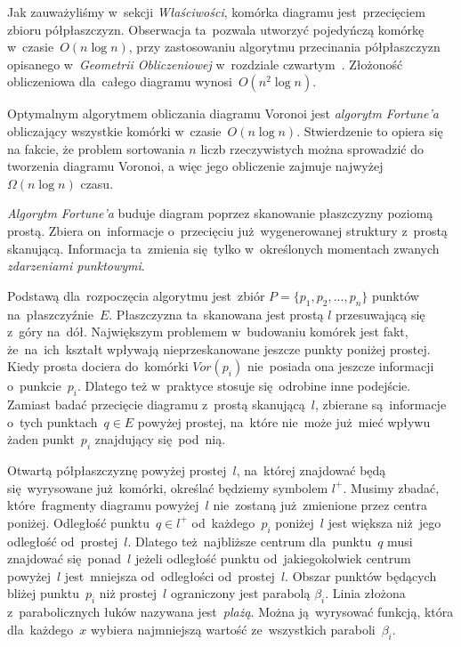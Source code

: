 \documentclass[skorowidz,autorrok,backref,xodstep,oswiadczenie]{wmimgr}
\begin{document}
Jak zauważyliśmy w~sekcji \emph{Właściwości}, komórka diagramu jest~przecięciem zbioru półpłaszczyzn. Obserwacja ta~pozwala utworzyć pojedyńczą komórkę w~czasie~$O(n \log{n})$, przy zastosowaniu algorytmu przecinania półpłaszczyzn opisanego w~\emph{Geometrii Obliczeniowej} w~rozdziale czwartym~\cite{geometria}. Złożoność obliczeniowa dla~całego diagramu wynosi~$O(n^2 \log{n})$.

Optymalnym algorytmem obliczania diagramu Voronoi jest \emph{algorytm Fortune'a} obliczający wszystkie komórki w~czasie~$O(n \log{n})$. Stwierdzenie to opiera się na fakcie, że problem sortowania $n$ liczb rzeczywistych można sprowadzić do tworzenia diagramu Voronoi, a więc jego obliczenie zajmuje najwyżej $\Omega(n \log{n})$ czasu.

\emph{Algorytm Fortune'a} buduje diagram poprzez skanowanie płaszczyzny poziomą prostą. Zbiera on~informacje o~przecięciu już~wygenerowanej struktury z~prostą skanującą. Informacja ta~zmienia się~tylko w~określonych momentach zwanych \emph{zdarzeniami punktowymi}.

Podstawą dla~rozpoczęcia algorytmu jest~zbiór $P = \{p_{1},p_{2},...,p_{n}\}$ punktów na~płaszczyźnie~$E$. Płaszczyzna ta~skanowana jest prostą $l$ przesuwającą się z~góry na~dół. Największym problemem w~budowaniu komórek jest fakt, że~na~ich~kształt wpływają nieprzeskanowane jeszcze punkty poniżej prostej. Kiedy prosta dociera do~komórki $Vor(p_{i})$ nie~posiada ona jeszcze informacji o~punkcie~$p_{i}$. Dlatego też w~praktyce stosuje się~odrobine inne podejście. Zamiast badać przecięcie diagramu z~prostą skanującą~$l$, zbierane są~informacje o~tych punktach~$q \in E$ powyżej prostej, na~które nie~może już~mieć wpływu żaden punkt~$p_{i}$ znajdujący się~pod~nią.

Otwartą półpłaszczyznę powyżej prostej~$l$, na~której znajdować będą się~wyrysowane już~komórki, określać będziemy symbolem $l^{+}$. Musimy zbadać, które~fragmenty diagramu powyżej~$l$ nie~zostaną już~zmienione przez centra poniżej. Odległość punktu~$q \in l^{+}$ od~każdego~$p_{i}$ poniżej~$l$ jest większa niż~jego odległość od~prostej~$l$. Dlatego też~najbliższe centrum dla~punktu~$q$ musi znajdować się~ponad~$l$ jeżeli odległość punktu od~jakiegokolwiek centrum powyżej~$l$ jest~mniejsza od~odległości od~prostej~$l$. Obszar punktów będących bliżej punktu~$p_{i}$ niż prostej~$l$ ograniczony jest parabolą $\beta_{i}$. Linia złożona z~parabolicznych łuków nazywana jest~\emph{plażą}. Można ją~wyrysować funkcją, która dla~każdego~$x$ wybiera najmniejszą wartość ze~wszystkich paraboli~$\beta_{i}$.
\end{document}
